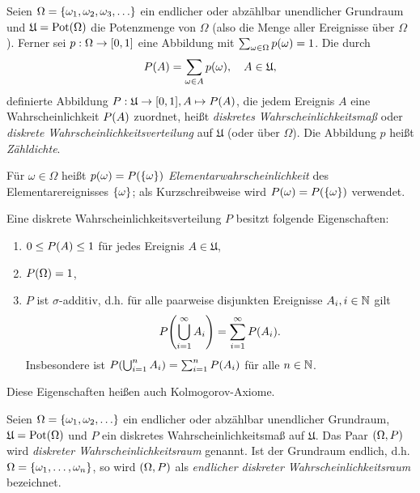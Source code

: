 \documentclass{lecture}
\begin{document}
    \begin{definition}
        Seien \(\Omega = \braces*{\omega_1, \omega_2, \omega_3, \ldots}\) ein endlicher oder abzählbar unendlicher Grundraum und \(\mathfrak{U} = \Pot\parentheses*{\Omega}\) die Potenzmenge von \(\Omega\) (also die Menge aller Ereignisse über \(\Omega\)).
        Ferner sei \(p: \Omega \to \brackets*{0, 1}\) eine Abbildung mit \(\sum_{\omega \in \Omega}p\parentheses*{\omega} = 1\).
        Die durch
        \[
            P\parentheses*{A} = \sum_{\omega \in A}p\parentheses*{\omega}, \quad A \in \mathfrak{U},
        \]
        definierte Abbildung \(P: \mathfrak{U} \to \brackets*{0, 1}, A \mapsto P\parentheses*{A}\), die jedem Ereignis \(A\) eine Wahrscheinlichkeit \(P\parentheses*{A}\) zuordnet, heißt \emph{diskretes Wahrscheinlichkeitsmaß} oder \emph{diskrete Wahrscheinlichkeitsverteilung} auf \(\mathfrak{U}\) (oder über \(\Omega\)).
        Die Abbildung \(p\) heißt \emph{Zähldichte}.

        Für \(\omega \in \Omega\) heißt \(p\parentheses*{\omega} = P\parentheses*{\braces*{\omega}}\) \emph{Elementarwahrscheinlichkeit} des Elementarereignisses \(\braces*{\omega}\); als Kurzschreibweise wird \(P\parentheses*{\omega} = P\parentheses*{\braces*{\omega}}\) verwendet.
    \end{definition}

    \begin{remark}
        Eine diskrete Wahrscheinlichkeitsverteilung \(P\) besitzt folgende Eigenschaften:
        \begin{enumerate}
            \item \(0 \le P\parentheses*{A} \le 1\) für jedes Ereignis \(A \in \mathfrak{U}\),
            \item \(P\parentheses*{\Omega} = 1\),
            \item \(P\) ist \(\sigma\)-additiv, d.h. für alle paarweise disjunkten Ereignisse \(A_i, i \in \N\) gilt
            \[
                P\parentheses*{\bigcup_{i = 1}^\infty A_i} = \sum_{i = 1}^\infty P\parentheses*{A_i}.
            \]
            Insbesondere ist \(P\parentheses*{\bigcup_{i = 1}^n A_i} = \sum_{i = 1}^n P\parentheses*{A_i}\) für alle \(n \in \N\).
        \end{enumerate}
    \end{remark}

    Diese Eigenschaften heißen auch Kolmogorov-Axiome.

    \begin{definition}
        Seien \(\Omega = \braces*{\omega_1, \omega_2, \ldots}\) ein endlicher oder abzählbar unendlicher Grundraum, \(\mathfrak{U} = \Pot\parentheses*{\Omega}\) und \(P\) ein diskretes Wahrscheinlichkeitsmaß auf \(\mathfrak{U}\).
        Das Paar \(\parentheses*{\Omega, P}\) wird \emph{diskreter Wahrscheinlichkeitsraum} genannt.
        Ist der Grundraum endlich, d.h. \(\Omega = \braces*{\omega_1, \ldots, \omega_n}\), so wird \(\parentheses*{\Omega, P}\) als \emph{endlicher diskreter Wahrscheinlichkeitsraum} bezeichnet.
    \end{definition}
\end{document}
